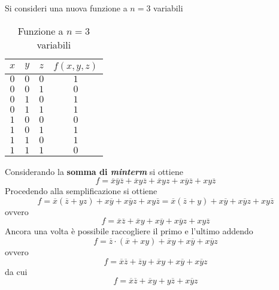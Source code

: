 \documentclass[a4paper]{extarticle}
\begin{document}
\vspace{1em}
\noindent
Si consideri una nuova funzione a \(n = 3\) variabili
\begin{table}[H]
    \centering
    \begin{tabular}{ccc|c}
         $x$ & $y$ & $z$ & $f(x, y, z)$\\
         \hline
         $0$ & $0$ & $0$ & $1$\\
         $0$ & $0$ & $1$ & $0$\\
         $0$ & $1$ & $0$ & $1$\\
         $0$ & $1$ & $1$ & $1$\\
         $1$ & $0$ & $0$ & $0$\\
         $1$ & $0$ & $1$ & $1$\\
         $1$ & $1$ & $0$ & $1$\\
         $1$ & $1$ & $1$ & $0$\\
    \end{tabular}
    \caption{Funzione a \(n = 3\) variabili}
    \label{tab:funzione_3_variabili_4}
\end{table}

Considerando la \textbf{somma di \textit{minterm}} si ottiene
\[f = \overline{x} \overline{y} \overline{z} + \overline{x} y \overline{z} + \overline{x} y z + x \overline{y} \overline{z} + xy \overline{z}\]
Procedendo alla semplificazione si ottiene
\[f = \overline{x} (\overline{z} + yz) + x \overline{y} + x\overline{y}z + xy \overline{z} = \overline{x} (\overline{z} + y) + x \overline{y} + x\overline{y}z + xy \overline{z}\]
ovvero
\[f = \overline{x}\overline{z} + \overline{x}y + x \overline{y} + x\overline{y}z + xy \overline{z}\]
Ancora una volta è possibile raccogliere il primo e l'ultimo addendo
\[f = \overline{z} \cdot (\overline{x} + xy) + \overline{x}y + x \overline{y} + x\overline{y}z\]
ovvero
\[f = \overline{x}\overline{z} + \overline{z}y + \overline{x}y + x \overline{y} + x\overline{y}z\]
da cui
\[f = \overline{x}\overline{z} + \overline{x}y + y \overline{z} + x\overline{y}z\]
\end{document}
